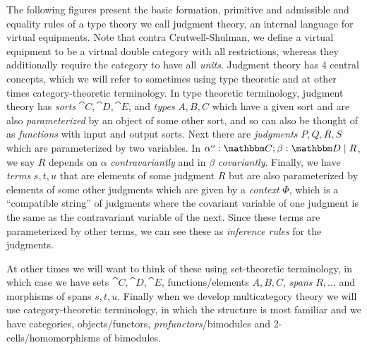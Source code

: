 \documentclass{article}
\begin{document}
The following figures present the basic formation, primitive and
admissible and equality rules of a type theory we call judgment
theory, an internal language for virtual equipments.
%
Note that contra Crutwell-Shulman, we define a virtual equipment to be
a virtual double category with all restrictions, whereas they
additionally require the category to have all \emph{units}.
%
Judgment theory has 4 central concepts, which we will refer to
sometimes using type theoretic and at other times category-theoretic
terminology.
%
In type theoretic terminology, judgment theory has \emph{sorts} $\cat
C, \cat D, \cat E$, and \emph{types} $A,B,C$ which have a given sort
and are also \emph{parameterized} by an object of some other sort, and
so can also be thought of as \emph{functions} with input and output
sorts.
%
Next there are \emph{judgments} $P,Q,R,S$ which are parameterized by
two variables.
%
In $\alpha^o:\cat C;\beta : \cat D \pipe R$, we say $R$ depends on
$\alpha$ \emph{contravariantly} and in $\beta$ \emph{covariantly}.
%
Finally, we have \emph{terms} $s,t,u$ that are elements of some
judgment $R$ but are also parameterized by elements of some other
judgments which are given by a \emph{context} $\Phi$, which is a
``compatible string'' of judgments where the covariant variable of one
judgment is the same as the contravariant variable of the next.
%
Since these terms are parameterized by other terms, we can see these
as \emph{inference rules} for the judgments.

At other times we will want to think of these using set-theoretic
terminology, in which case we have sets $\cat C,\cat D, \cat E$,
functions/elements $A,B,C$, \emph{spans} $R,\ldots$ and morphisms of
spans $s,t,u$.
%
Finally when we develop multicategory theory we will use
category-theoretic terminology, in which the structure is most
familiar and we have categories, objects/functors,
\emph{profunctors}/bimodules and 2-cells/homomorphisms of bimodules.
\end{document}
